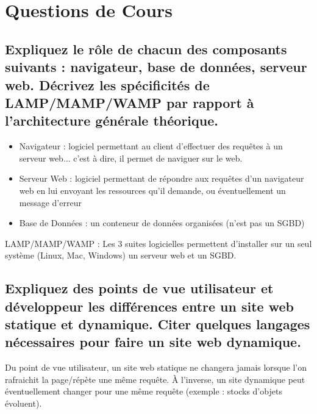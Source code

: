 \documentclass[11pt,a4paper]{article}
\begin{document}
\MakeExamTitle                   %


\section{Questions de Cours}

\bigskip

\subsection{Expliquez le rôle de chacun des composants suivants : navigateur, base de données, serveur web. Décrivez les spécificités de LAMP/MAMP/WAMP par rapport à l'architecture générale théorique.}

\bigskip

\begin{itemize}
\item Navigateur : logiciel permettant au client d'effectuer des requêtes à un serveur web... c'est à dire, il permet de naviguer sur le web.
\item Serveur Web : logiciel permettant de répondre aux requêtes d'un navigateur web en lui envoyant les ressources qu'il demande, ou éventuellement un message d'erreur
\item Base de Données : un conteneur de données organisées (n'est pas un SGBD)
\end{itemize}

LAMP/MAMP/WAMP : Les 3 suites logicielles permettent d'installer sur un seul système (Linux, Mac, Windows) un serveur web et un SGBD.

\bigskip

\subsection{Expliquez des points de vue utilisateur et développeur les différences entre un site web statique et dynamique. Citer quelques langages nécessaires pour faire un site web dynamique.}

\bigskip

Du point de vue utilisateur, un site web statique ne changera jamais lorsque l'on rafraichit la page/répète une même requête.
\`A l'inverse, un site dynamique peut éventuellement changer pour une même requête (exemple : stocks d'objets évoluent).
\end{document}
